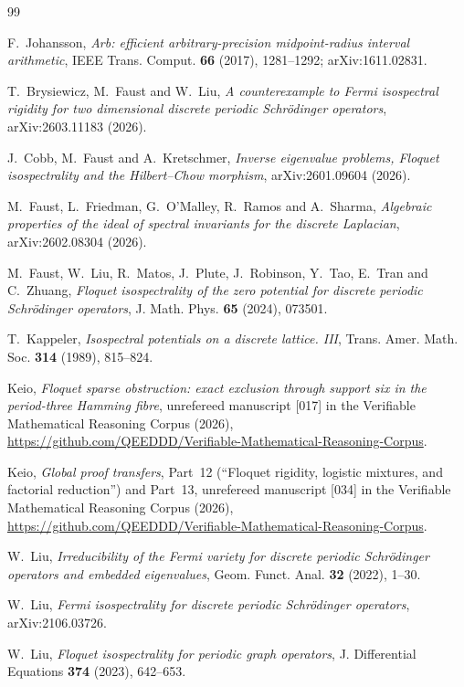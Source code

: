\documentclass[11pt,reqno]{amsart}
\theoremstyle{definition}
\theoremstyle{remark}
\begin{document}
\begin{thebibliography}{99}

F.~Johansson,
\emph{Arb: efficient arbitrary-precision midpoint-radius interval arithmetic},
IEEE Trans. Comput. \textbf{66} (2017), 1281--1292; arXiv:1611.02831.

T.~Brysiewicz, M.~Faust and W.~Liu,
\emph{A counterexample to Fermi isospectral rigidity for two dimensional
discrete periodic Schr\"odinger operators},
arXiv:2603.11183 (2026).

J.~Cobb, M.~Faust and A.~Kretschmer,
\emph{Inverse eigenvalue problems, Floquet isospectrality and the
Hilbert--Chow morphism},
arXiv:2601.09604 (2026).

M.~Faust, L.~Friedman, G.~O'Malley, R.~Ramos and A.~Sharma,
\emph{Algebraic properties of the ideal of spectral invariants for the
discrete Laplacian},
arXiv:2602.08304 (2026).

M.~Faust, W.~Liu, R.~Matos, J.~Plute, J.~Robinson, Y.~Tao, E.~Tran and
C.~Zhuang,
\emph{Floquet isospectrality of the zero potential for discrete periodic
Schr\"odinger operators},
J. Math. Phys. \textbf{65} (2024), 073501.

T.~Kappeler,
\emph{Isospectral potentials on a discrete lattice. III},
Trans. Amer. Math. Soc. \textbf{314} (1989), 815--824.

Keio,
\emph{Floquet sparse obstruction: exact exclusion through support six in the
period-three Hamming fibre}, unrefereed manuscript [017] in the Verifiable
Mathematical Reasoning Corpus (2026),
\url{https://github.com/QEEDDD/Verifiable-Mathematical-Reasoning-Corpus}.

Keio,
\emph{Global proof transfers}, Part~12 (``Floquet rigidity, logistic mixtures,
and factorial reduction'') and Part~13, unrefereed manuscript [034] in the
Verifiable Mathematical Reasoning Corpus (2026),
\url{https://github.com/QEEDDD/Verifiable-Mathematical-Reasoning-Corpus}.

W.~Liu,
\emph{Irreducibility of the Fermi variety for discrete periodic Schr\"odinger
operators and embedded eigenvalues},
Geom. Funct. Anal. \textbf{32} (2022), 1--30.

W.~Liu,
\emph{Fermi isospectrality for discrete periodic Schr\"odinger operators},
arXiv:2106.03726.

W.~Liu,
\emph{Floquet isospectrality for periodic graph operators},
J. Differential Equations \textbf{374} (2023), 642--653.


\end{thebibliography}
\end{document}
